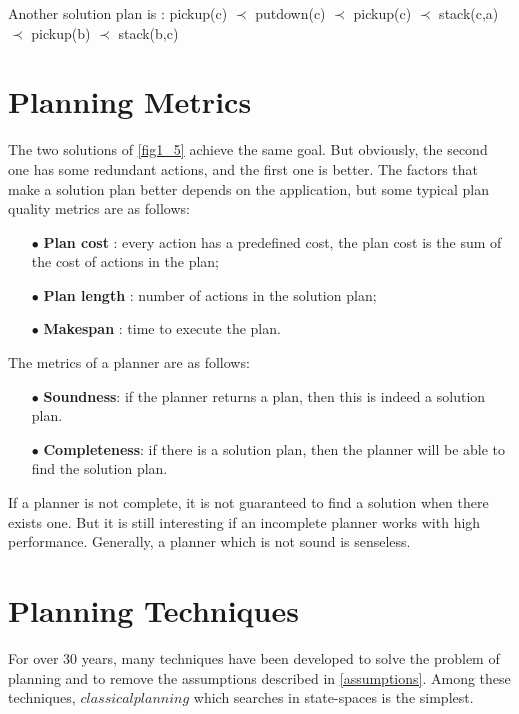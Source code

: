 Another solution plan is :
pickup(c) $\prec$ putdown(c) $\prec$ pickup(c) $\prec$ stack(c,a) $\prec$ pickup(b) $\prec$ stack(b,c)

\section{Planning Metrics}
\label{metrics}
The two solutions of \autoref{fig1_5} achieve the same goal. But obviously, the second one has some redundant actions, and the first one is better. The factors that make a solution plan better depends on the application, but some typical plan quality metrics are as follows:
\begin{itemize}\itemsep0pt \parskip0pt 
\item[$\bullet$]\textbf{Plan cost} : every action has a predefined cost, the plan cost is the sum of the cost of actions in the plan;
\item[$\bullet$]\textbf{Plan length} : number of actions in the solution plan;
\item[$\bullet$]\textbf{Makespan} : time to execute the plan.
\end{itemize}

The metrics of a planner are as follows:
\begin{itemize}\itemsep0pt \parskip0pt 
\item[$\bullet$] \textbf{Soundness}: if the planner returns a plan, then this is indeed a solution plan.
\item[$\bullet$] \textbf{Completeness}: if there is a solution plan, then the planner will be able to find the solution plan.
\end{itemize}

If a planner is not complete, it is not guaranteed to find a solution when there exists one. But it is still interesting if an incomplete planner works with high performance. Generally, a planner which is not sound is senseless.

\section{Planning Techniques}
\label{PlanningTechniques}
For over 30 years, many techniques have been developed to solve the problem of planning and to remove the assumptions described in \autoref{assumptions}. Among these techniques, $classical planning$ which searches in state-spaces is the simplest. 

